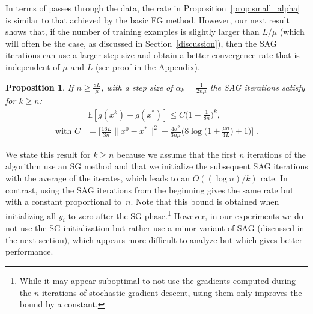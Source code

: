 \documentclass{article}
\newtheorem{proposition}{Proposition}
\newcommand{\mysec}[1]{Section~\ref{sec:#1}}
\begin{document}
In terms of passes through the data, the rate in Proposition~\ref{prop:small_alpha} is similar to that achieved by the basic FG method.
However, our
next result shows that, if the number of training examples is slightly
larger than $L/\mu$ (which will often be the case, as discussed in Section~\ref{discussion}), then the SAG
iterations can use a larger step size and obtain a better convergence rate
that is independent of $\mu$ and $L$ (see proof in the Appendix).

\begin{proposition}
\label{prop:large_alpha}
If $ n \geqslant \frac{8L}{\mu}$, with a step size of $ \alpha_k
= \frac{1}{2n\mu}$ the SAG iterations satisfy for $k \geqslant n$:
{
\begin{align*}
&\mathbb{E}\left[g(x^k) - g(x^\ast)\right] \leqslant C \Big(1 - \frac{1}{8n}\Big)^k, \\
\textrm{with } C &= \bigg[\frac{16L}{3n}\| x^0 - x^\ast\|^2 + \frac{4 \sigma^2 }{3n \mu}\Big(8 \log\Big( 1 + \frac{\mu n }{4L } \Big) + 1\Big)\bigg] \; .
\end{align*}
}
\end{proposition}
We state this result for $k \geqslant n$ because we assume that the first $n$ iterations of the algorithm use an SG method and that we initialize the subsequent SAG iterations with the average of the iterates, which leads to an $O((\log n)/k)$ rate.
In contrast, using the SAG iterations
from the beginning gives the same rate but with a constant proportional to~$n$.
Note that this bound is obtained when initializing all $y_i$ to zero after the SG phase.\footnote{While it may appear suboptimal to not use the gradients computed during the $n$ iterations of stochastic gradient descent, using them only improves the bound by a constant.} 
However, in our experiments we do not use the SG initialization but rather use a minor variant of SAG (discussed in the next section), which appears more difficult to analyze but which gives better performance. 
\end{document}
